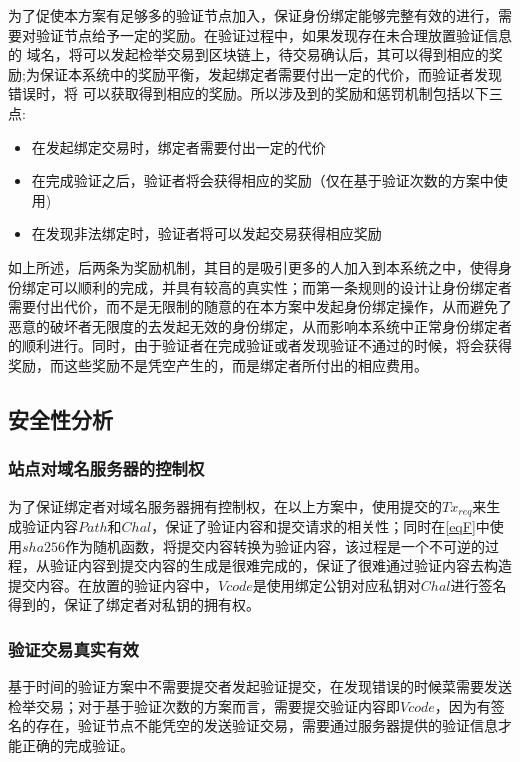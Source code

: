 为了促使本方案有足够多的验证节点加入，保证身份绑定能够完整有效的进行，需要对验证节点给予一定的奖励。在验证过程中，如果发现存在未合理放置验证信息的 域名，将可以发起检举交易到区块链上，待交易确认后，其可以得到相应的奖励;为保证本系统中的奖励平衡，发起绑定者需要付出一定的代价，而验证者发现错误时，将 可以获取得到相应的奖励。所以涉及到的奖励和惩罚机制包括以下三点:

\begin{itemize}
	\item 在发起绑定交易时，绑定者需要付出一定的代价
	\item 在完成验证之后，验证者将会获得相应的奖励（仅在基于验证次数的方案中使用)
	\item 在发现非法绑定时，验证者将可以发起交易获得相应奖励
\end{itemize}

如上所述，后两条为奖励机制，其目的是吸引更多的人加入到本系统之中，使得身份绑定可以顺利的完成，并具有较高的真实性；而第一条规则的设计让身份绑定者需要付出代价，而不是无限制的随意的在本方案中发起身份绑定操作，从而避免了恶意的破坏者无限度的去发起无效的身份绑定，从而影响本系统中正常身份绑定者的顺利进行。同时，由于验证者在完成验证或者发现验证不通过的时候，将会获得奖励，而这些奖励不是凭空产生的，而是绑定者所付出的相应费用。


\subsection{安全性分析}

\subsubsection{站点对域名服务器的控制权}

为了保证绑定者对域名服务器拥有控制权，在以上方案中，使用提交的$Tx_{req}$来生成验证内容$Path$和$Chal$，保证了验证内容和提交请求的相关性；同时在\eqref{eqF}中使用$sha256$作为随机函数，将提交内容转换为验证内容，该过程是一个不可逆的过程，从验证内容到提交内容的生成是很难完成的，保证了很难通过验证内容去构造提交内容。在放置的验证内容中，$Vcode$是使用绑定公钥对应私钥对$Chal$进行签名得到的，保证了绑定者对私钥的拥有权。


\subsubsection{验证交易真实有效}

基于时间的验证方案中不需要提交者发起验证提交，在发现错误的时候菜需要发送检举交易；对于基于验证次数的方案而言，需要提交验证内容即$Vcode$，因为有签名的存在，验证节点不能凭空的发送验证交易，需要通过服务器提供的验证信息才能正确的完成验证。

